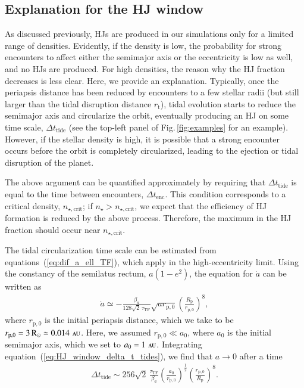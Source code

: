 \documentclass[iop,usenatbib]{emulateapj}
\newcommand{\F}{Fig.}
\newcommand{\rsun}{\mathrm{R}_\odot}
\newcommand{\au}{\,\textsc{au}}
\begin{document}
\subsection{Explanation for the HJ window}
\label{sect:discussion:HJ_window}
As discussed previously, HJs are produced in our simulations only for a limited range of densities. Evidently, if the density is low, the probability for strong encounters to affect either the semimajor axis or the eccentricity is low as well, and no HJs are produced. For high densities, the reason why the HJ fraction decreases is less clear. Here, we provide an explanation. Typically, once the periapsis distance has been reduced by encounters to a few stellar radii (but still larger than the tidal disruption distance $r_\mathrm{t}$), tidal evolution starts to reduce the semimajor axis and circularize the orbit, eventually producing an HJ on some time scale, $\Delta t_\mathrm{tide}$ (see the top-left panel of \F\,\ref{fig:examples} for an example). However, if the stellar density is high, it is possible that a strong encounter occurs before the orbit is completely circularized, leading to the ejection or tidal disruption of the planet.

The above argument can be quantified approximately by requiring that $\Delta t_\mathrm{tide}$ is equal to the time between encounters, $\Delta t_\mathrm{enc}$. This condition corresponds to a critical density, $n_{\star,\mathrm{crit}}$; if $n_\star > n_{\star,\mathrm{crit}}$, we expect that the efficiency of HJ formation is reduced by the above process. Therefore, the maximum in the HJ fraction should occur near $n_{\star,\mathrm{crit}}$. 

The tidal circularization time scale can be estimated from equations~(\ref{eq:dif_a_ell_TF}), which apply in the high-eccentricity limit. Using the constancy of the semilatus rectum, $a\left(1-e^2\right)$, the equation for $\dot{a}$ can be written as
\begin{align}
\label{eq:HJ_window_delta_t_tides}
\dot{a} \simeq - \frac{\beta_a}{128 \sqrt{2}\,\tau_\mathrm{TF}} \sqrt{a r_\mathrm{p,0}} \left ( \frac{R_\mathrm{p}}{r_\mathrm{p,0}} \right )^8,
\end{align}
where $r_\mathrm{p,0}$ is the initial periapsis distance, which we take to be $r_\mathrm{p,0} = 3 \, \rsun \simeq 0.014 \,\au$. Here, we assumed $r_\mathrm{p,0} \ll a_0$, where $a_0$ is the initial semimajor axis, which we set to $a_0=1\,\au$. Integrating equation~(\ref{eq:HJ_window_delta_t_tides}), we find that $a\to 0$ after a time 
\begin{align}
\Delta t_\mathrm{tide} \sim 256 \sqrt{2} \, \frac{\tau_\mathrm{TF}}{\beta_a} \left ( \frac{a_0}{r_\mathrm{p,0}} \right )^{\frac{1}{2}} \left ( \frac{r_\mathrm{p,0}}{R_\mathrm{p}} \right )^8.
\end{align}
\end{document}
